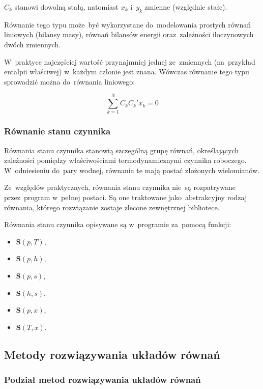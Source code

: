 $C_k$ stanowi dowolną stałą, natomiast $x_k$ i~$y_k$ zmienne (względnie
stałe).

Równanie tego typu może~być wykorzystane do~modelowania prostych równań
liniowych (bilansy masy), równań bilansów energii oraz~zależności
iloczynowych dwóch zmiennych.

W~praktyce najczęściej wartość przynajmniej jednej ze~zmiennych
(na~przykład entalpii właściwej) w~każdym członie jest znana. Wówczas
równanie tego typu sprowadzić można do~równania liniowego:

\begin{equation}
	\sum_{k=1}^N C_k C_k' x_k = 0
\end{equation}


\subsubsection{Równanie stanu czynnika}

Równania stanu czynnika stanowią szczególną grupę równań, określających
zależności pomiędzy właściwościami termodynamicznymi czynnika roboczego.
W~odniesieniu do~pary wodnej, równania te mają postać złożonych
wielomianów.

Ze~względów praktycznych, równania stanu czynnika nie~są rozpatrywane
przez~program w~pełnej postaci. Są one traktowane jako~abstrakcyjny
rodzaj równania, którego rozwiązanie zostaje zlecone zewnętrznej
bibliotece.

Równania stanu czynnika opisywane są w~programie za~pomocą funkcji:

\begin{itemize}
	\item $\mathbf{S}(p, T)$,
	\item $\mathbf{S}(p, h)$,
	\item $\mathbf{S}(p, s)$,
	\item $\mathbf{S}(h, s)$,
	\item $\mathbf{S}(p, x)$,
	\item $\mathbf{S}(T, x)$.
\end{itemize}


\subsection{Metody rozwiązywania układów równań}

\subsubsection{Podział metod rozwiązywania układów równań}

